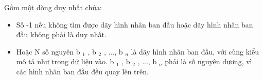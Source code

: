 Gồm một dòng duy nhất chứa:  
\begin{itemize}
	\item     Số -1 nếu không tìm được dãy hình nhân ban đầu hoặc dãy hình nhân ban đầu không phải là duy nhất.   
	\item     Hoặc N số nguyên b    $_     1    $    , b    $_     2    $    , ..., b    $_     n    $    là dãy hình nhân ban đầu, với cùng kiểu mô tả như trong dữ liệu vào. b    $_     1    $    , b    $_     2    $    , ..., b    $_     n    $    phải là số nguyên dương, vì các hình nhân ban đầu đều quay lên trên.   
\end{itemize}